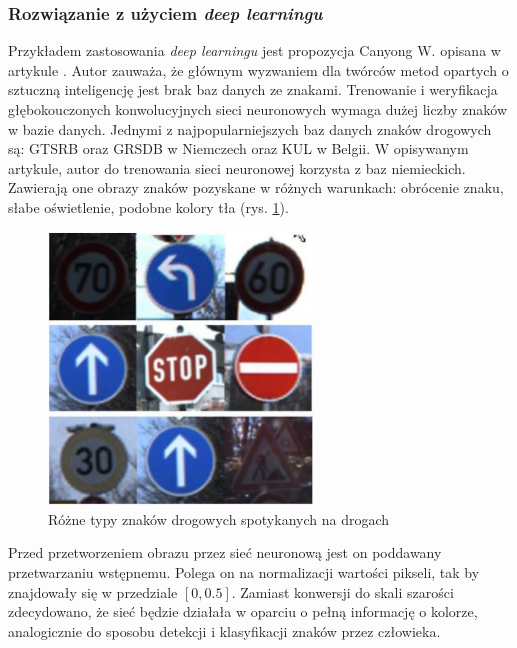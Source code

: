 
\subsubsection{Rozwiązanie z użyciem \textit{deep learningu}}

Przykładem zastosowania \textit{deep learningu} jest propozycja Canyong W. opisana w artykule \cite{T8}. 
Autor zauważa, że głównym wyzwaniem dla twórców metod opartych o sztuczną inteligencję jest brak baz danych ze znakami. 
Trenowanie i weryfikacja głębokouczonych konwolucyjnych sieci neuronowych wymaga dużej liczby znaków w bazie danych.
Jednymi z najpopularniejszych baz danych znaków drogowych są: GTSRB oraz GRSDB w Niemczech oraz KUL w Belgii. 
W opisywanym artykule, autor do trenowania sieci neuronowej korzysta z baz niemieckich. 
Zawierają one obrazy znaków pozyskane w różnych warunkach: obrócenie znaku, słabe oświetlenie, podobne kolory tła (rys. \ref{fig:sign_detection3_cnn_input}). 

\begin{figure}
  \centering
  \includegraphics[width=7cm]{img/sign_detection3_cnn_input.png}
  \caption{Różne typy znaków drogowych spotykanych na drogach\cite{T8}}
  \label{fig:sign_detection3_cnn_input}
\end{figure}

Przed przetworzeniem obrazu przez sieć neuronową jest on poddawany przetwarzaniu wstępnemu. Polega on na normalizacji wartości pikseli, tak by znajdowały się w przedziale $[0, 0.5]$. 
Zamiast konwersji do skali szarości zdecydowano, że sieć będzie działała w oparciu o pełną informację o kolorze, analogicznie do sposobu detekcji i klasyfikacji znaków przez człowieka.

